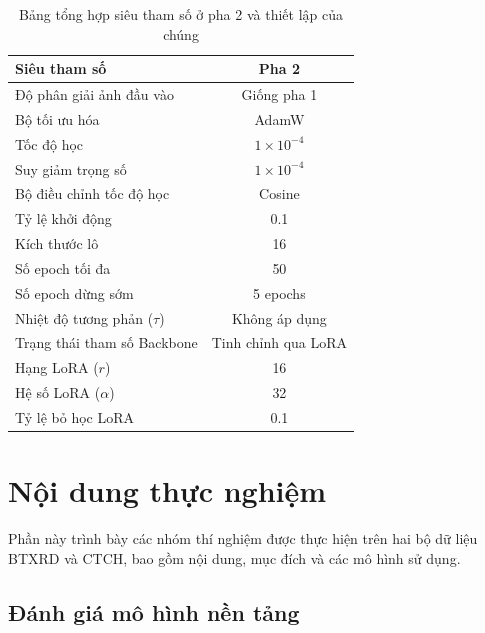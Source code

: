 \begin{table}[htbp]
\centering
\begin{tabular}{|l|c|}
\hline
\textbf{Siêu tham số}        & \textbf{Pha 2} \\ \hline
Độ phân giải ảnh đầu vào     & Giống pha 1                  \\ \hline
Bộ tối ưu hóa                & AdamW                        \\ \hline
Tốc độ học                   & $1 \times 10^{-4}$           \\ \hline
Suy giảm trọng số            & $1 \times 10^{-4}$           \\ \hline
Bộ điều chỉnh tốc độ học     & Cosine                       \\ \hline
Tỷ lệ khởi động              & 0.1                          \\ \hline
Kích thước lô                & 16                           \\ \hline
Số epoch tối đa              & 50                           \\ \hline
Số epoch dừng sớm            & 5 epochs                     \\ \hline
Nhiệt độ tương phản ($\tau$) & Không áp dụng                \\ \hline
Trạng thái tham số Backbone  & Tinh chỉnh qua LoRA          \\ \hline
Hạng LoRA ($r$)             & 16                           \\ \hline
Hệ số LoRA ($\alpha$)       & 32                           \\ \hline
Tỷ lệ bỏ học LoRA           & 0.1                          \\ \hline
\end{tabular}
\caption{Bảng tổng hợp siêu tham số ở pha 2 và thiết lập của chúng}
\label{tab:hyperparameters_phase2}
\end{table}

\section{Nội dung thực nghiệm}
Phần này trình bày các nhóm thí nghiệm được thực hiện trên hai bộ dữ liệu BTXRD và CTCH, bao gồm nội dung, mục đích và các mô hình sử dụng.

\subsection{Đánh giá mô hình nền tảng}
\label{subsec:foundation_model_evaluation}

